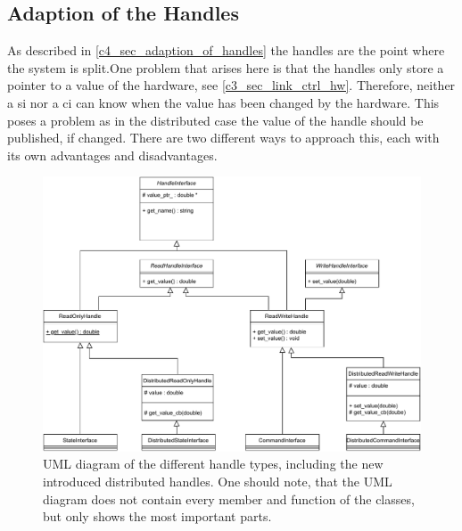 \subsection{Adaption of the Handles}
As described in \autoref{c4_sec_adaption_of_handles} the \glspl{handle} are the point where the system is split.One problem that arises here is that the \glspl{handle} only store a pointer to a value of the hardware, see \autoref{c3_sec_link_ctrl_hw}. Therefore, neither a \gls{si} nor a \gls{ci} can know when the value has been changed by the hardware. This poses a problem as in the distributed case the value of the \gls{handle} should be published, if changed. There are two different ways to approach this, each with its own advantages and disadvantages.
\begin{figure}[htbp]
	\centering
	\includegraphics[width=1\textwidth]{Figures/c5/Handles_UML.pdf}
	\caption{UML diagram of the different \gls{handle} types, including the new introduced distributed \glspl{handle}. One should note, that the UML diagram does not contain every member and function of the classes, but only shows the most important parts. }
	\label{c5_fig_handle_uml}
\end{figure}
